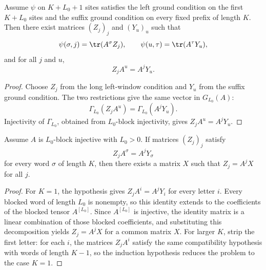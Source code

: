 \begin{lemma}\label{lem:left_tail_compatibility}
    \leanok
    Assume $\psi$ on $K+L_0+1$ sites satisfies the left ground condition on the
    first $K+L_0$ sites and the suffix ground condition on every fixed prefix of
    length $K$. Then there exist matrices $(Z_j)_j$ and $(Y_u)_u$ such that
    \[
        \psi(\sigma,j) = \tr(A^\sigma Z_j), \qquad
        \psi(u,\tau) = \tr(A^\tau Y_u),
    \]
    and for all $j$ and $u$,
    \[
        Z_j A^u = A^j Y_u.
    \]
\end{lemma}

\begin{proof}
    \leanok
    Choose $Z_j$ from the long left-window condition and $Y_u$ from the suffix
    ground condition. The two restrictions give the same vector in $G_{L_0}(A)$:
    \[
        \Gamma_{L_0}(Z_j A^u)=\Gamma_{L_0}(A^j Y_u).
    \]
    Injectivity of $\Gamma_{L_0}$, obtained from $L_0$-block injectivity, gives
    $Z_j A^u = A^j Y_u$.
\end{proof}

\begin{theorem}%
    \label{thm:right_factor_word_compatibility}
    \leanok
    Assume $A$ is $L_0$-block injective with $L_0 > 0$. If matrices $(Z_j)_j$
    satisfy
    \[
        Z_j A^\sigma = A^j Y_\sigma
    \]
    for every word $\sigma$ of length $K$, then there exists a matrix $X$ such
    that $Z_j = A^j X$ for all $j$.
\end{theorem}

\begin{proof}
    \leanok
    For $K = 1$, the hypothesis gives $Z_j A^i = A^j Y_i$ for every letter $i$.
    Every blocked word of length $L_0$ is nonempty, so this identity extends to
    the coefficients of the blocked tensor $A^{[L_0]}$. Since $A^{[L_0]}$ is
    injective, the identity matrix is a linear combination of those blocked
    coefficients, and substituting this decomposition yields $Z_j = A^j X$ for a
    common matrix $X$. For larger $K$, strip the first letter: for each $i$, the
    matrices $Z_j A^i$ satisfy the same compatibility hypothesis with words of
    length $K - 1$, so the induction hypothesis reduces the problem to the case
    $K = 1$.
\end{proof}

